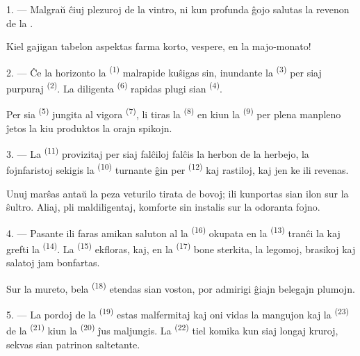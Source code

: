 \VUsaut{3.0mm}
\VUsaut{3.0mm}

\VUsaut{4.0mm}

1. --- Malgraŭ ĉiuj plezuroj de la vintro, ni kun profunda ĝojo salutas la
revenon de la .

Kiel gajigan tabelon aspektas farma korto, vespere, en la majo-monato!

2. --- Ĉe la horizonto la  \textsuperscript{(1)} malrapide kuŝigas
sin, inundante la  \textsuperscript{(3)} per siaj purpuraj
 \textsuperscript{(2)}. La diligenta 
\textsuperscript{(6)} rapidas plugi sian  \textsuperscript{(4)}.

Per sia  \textsuperscript{(5)} jungita al vigora
 \textsuperscript{(7)}, li tiras la 
\textsuperscript{(8)} en kiun la  \textsuperscript{(9)} per
plena manpleno ĵetos la  kiu produktos la orajn spikojn.

3. --- La  \textsuperscript{(11)} provizitaj per siaj
falĉiloj falĉis la herbon de la herbejo, la fojnfaristoj sekigis la
 \textsuperscript{(10)} turnante ĝin per 
\textsuperscript{(12)} kaj rastiloj, kaj jen ke ili revenas.

Unuj marŝas antaŭ la peza veturilo tirata de bovoj; ili kunportas sian ilon
sur la ŝultro. Aliaj, pli maldiligentaj, komforte sin instalis sur la odoranta
fojno.

4. --- Pasante ili faras amikan saluton al la 
\textsuperscript{(16)} okupata en la 
\textsuperscript{(13)} tranĉi la  kaj grefti la
 \textsuperscript{(14)}. La 
\textsuperscript{(15)} ekfloras, kaj, en la 
\textsuperscript{(17)} bone sterkita, la legomoj, brasikoj kaj salatoj jam
bonfartas.

Sur la mureto, bela  \textsuperscript{(18)} etendas sian voston,
por admirigi ĝiajn belegajn plumojn.

\VUsaut{3.0mm}

5. --- La pordoj de la  \textsuperscript{(19)} estas
malfermitaj kaj oni vidas la mangujon kaj la 
\textsuperscript{(23)} de la  \textsuperscript{(21)} kiun la
 \textsuperscript{(20)} ĵus maljungis. La
 \textsuperscript{(22)} tiel komika kun siaj longaj kruroj,
sekvas sian patrinon saltetante.

